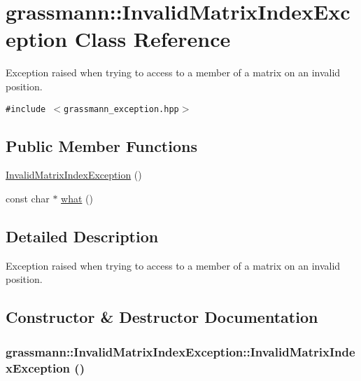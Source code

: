 \hypertarget{classgrassmann_1_1InvalidMatrixIndexException}{
\section{grassmann::InvalidMatrixIndexException Class Reference}
\label{classgrassmann_1_1InvalidMatrixIndexException}
}
Exception raised when trying to access to a member of a matrix on an invalid position.  


{\tt \#include $<$grassmann\_\-exception.hpp$>$}

\subsection*{Public Member Functions}
\begin{CompactItemize}
\item 
\hyperlink{classgrassmann_1_1InvalidMatrixIndexException_a035f610869bf3ab4bef381d689ae14c}{InvalidMatrixIndexException} ()
\item 
const char $\ast$ \hyperlink{classgrassmann_1_1InvalidMatrixIndexException_a1421e41a34728f9f7cc8a8c3d167150}{what} ()
\end{CompactItemize}


\subsection{Detailed Description}
Exception raised when trying to access to a member of a matrix on an invalid position. 

\subsection{Constructor \& Destructor Documentation}
\hypertarget{classgrassmann_1_1InvalidMatrixIndexException_a035f610869bf3ab4bef381d689ae14c}{
\subsubsection[InvalidMatrixIndexException]{\setlength{\rightskip}{0pt plus 5cm}grassmann::InvalidMatrixIndexException::InvalidMatrixIndexException ()}}
\label{classgrassmann_1_1InvalidMatrixIndexException_a035f610869bf3ab4bef381d689ae14c}




